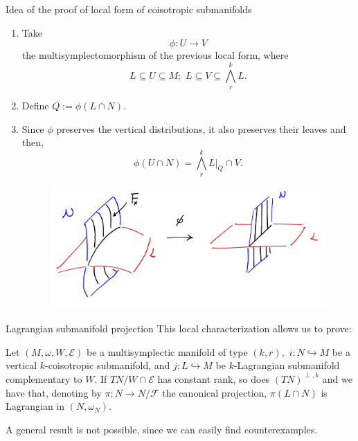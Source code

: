 \begin{frame}{Idea of the proof of local form of coisotropic submanifolds}
    \begin{enumerate}
        \item Take $$\phi: U \rightarrow V$$ the multisymplectomorphism of the previous local form, where $$L \subseteq U \subseteq M; \,\, L \subseteq V \subseteq \bigwedge^k_r L.$$

        \item Define $Q:= \phi(L \cap N).$

        \item Since $\phi$ preserves the vertical distributions, it also preserves their leaves and then, $$\phi(U \cap N) = \bigwedge ^k_r L \big |_ Q \cap V.$$
        \begin{figure}
            \centering
            \includegraphics[scale = 0.2]{theorem.PNG}
        \end{figure}
    \end{enumerate}
\end{frame}

\begin{frame}{Lagrangian submanifold projection}
This local characterization allows us to prove:
\begin{theorem} Let $(M, \omega, W, \mathcal{E})$ be a multisymplectic manifold of type $(k,r),$ $i: N \hookrightarrow M$ be a vertical $k$-coisotropic submanifold, and $j: L \hookrightarrow M$ be $k$-Lagrangian submanifold complementary to $W$. If $TN / W \cap \mathcal{E}$ has constant rank, so does $(TN)^{\perp, k}$ and we have that, denoting by $\pi: N \rightarrow N/\mathcal{F}$ the canonical projection, \alert{$\pi(L \cap N)$ is Lagrangian in $(N, \omega_N)$}.
\end{theorem}

A general result is not possible, since we can easily find counterexamples.
\end{frame}

